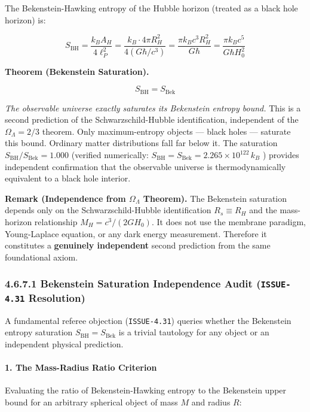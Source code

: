 \documentclass[11pt,a4paper]{article}
\theoremstyle{definition}\newtheorem{definition}{Definition}
\theoremstyle{remark}\newtheorem{remark}{Remark}
\begin{document}
The Bekenstein-Hawking entropy of the Hubble horizon (treated as a black hole horizon) is:


\begin{equation}
S_{\text{BH}} = \frac{k_B A_H}{4 \ell_P^2} = \frac{k_B \cdot 4\pi R_H^2}{4 (G\hbar/c^3)} = \frac{\pi k_B c^3 R_H^2}{G\hbar} = \frac{\pi k_B c^5}{G \hbar H_0^2}
\end{equation}


\textbf{Theorem (Bekenstein Saturation).}


\begin{equation}
\boxed{S_{\text{BH}} = S_{\text{Bek}}}
\end{equation}


\textit{The observable universe exactly saturates its Bekenstein entropy bound.} This is a second prediction of the Schwarzschild-Hubble identification, independent of the $\Omega_\Lambda = 2/3$ theorem. Only maximum-entropy objects — black holes — saturate this bound. Ordinary matter distributions fall far below it. The saturation $S_{\text{BH}} / S_{\text{Bek}} = 1.000$ (verified numerically: $S_{\text{BH}} = S_{\text{Bek}} = 2.265 \times 10^{122} \, k_B$ ) provides independent confirmation that the observable universe is thermodynamically equivalent to a black hole interior.

\textbf{Remark (Independence from $\Omega_\Lambda$ Theorem).} The Bekenstein saturation depends only on the Schwarzschild-Hubble identification $R_s \equiv R_H$ and the mass-horizon relationship $M_H = c^3/(2GH_0)$. It does not use the membrane paradigm, Young-Laplace equation, or any dark energy measurement. Therefore it constitutes a \textbf{genuinely independent} second prediction from the same foundational axiom.
\subsubsection{4.6.7.1 Bekenstein Saturation Independence Audit (\texttt{ISSUE-4.31} Resolution)}

A fundamental referee objection (\texttt{ISSUE-4.31}) queries whether the Bekenstein entropy saturation $S_{\text{BH}} = S_{\text{Bek}}$ is a trivial tautology for any object or an independent physical prediction.
\paragraph{1. The Mass-Radius Ratio Criterion}

Evaluating the ratio of Bekenstein-Hawking entropy to the Bekenstein upper bound for an arbitrary spherical object of mass $M$ and radius $R$:
\end{document}
